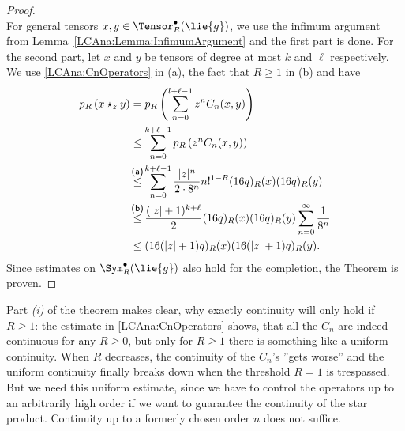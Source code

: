 \begin{proof}
\begin{equation*}
    \end{equation*}
    For general tensors $x,y \in \Tensor_R^{\bullet}(\lie{g})$, we use the 
    infimum argument from Lemma~\ref{LCAna:Lemma:InfimumArgument} and the 
    first part is done. For the second part, let $x$ and $y$
    be tensors of degree at most $k$ and $\ell$ respectively. We use
    \eqref{LCAna:CnOperators} in (a), the fact that $R \geq 1$ in (b) and have
    \begin{align}
	    \nonumber
	    	p_R \left(
	    	x \star_z y
	    	\right)
	    	& =
	    	p_R \left(
	    		\sum\limits_{n=0}^{l + \ell - 1}
	    		z^n C_n(x, y)
	    	\right)
	    	\\
	    \nonumber
	    	& \leq
	    	\sum\limits_{n=0}^{k + \ell - 1}
	    	p_R \left(
	    		z^n C_n(x, y)
	    	\right)
	    	\\
	    \label{LCAna:2MonomialEstimate}
	    	& \ot{(a)}{\leq}
	    	\sum\limits_{n=0}^{k + \ell - 1}
	    	\frac{|z|^n}{2 \cdot 8^n}
	    	n!^{1 - R}
	    	(16 q)_R(x)
	    	(16 q)_R(y)
	    	\\
	    \nonumber
	    	& \ot{(b)}{\leq}
	    	\frac{(|z| + 1)^{k + \ell}}{2}
	    	(16 q)_R(x)
	    	(16 q)_R(y)
	    	\sum\limits_{n = 0}^{\infty}
	    	\frac{1}{8^n}
			\\
		\nonumber
			& \leq
	    	(16(|z| + 1) q)_R(x)
	    	(16(|z| + 1) q)_R(y).
    \end{align}
    Since estimates on $\Sym_R^{\bullet}(\lie{g})$ also hold for the
    completion, the Theorem is proven.
\end{proof}
\begin{remark}
	Part \textit{(i)} of the theorem makes clear, why exactly continuity will 
	only hold if $R \geq 1$: the estimate in \eqref{LCAna:CnOperators} shows, 
	that all the 	$C_n$ are indeed continuous for any $R \geq 0$, but only 
	for $R \geq 1$ there is something like a uniform continuity. When $R$ 
	decreases, the continuity of the $C_n$'s ''gets worse'' and the uniform 
	continuity finally breaks down when the threshold $R = 1$ is trespassed. 
	But we need this uniform estimate, since we have to control the operators 
	up to an arbitrarily high order if we want to guarantee the continuity of 
	the 	star product. Continuity up to a formerly chosen order $n$ does not 
	suffice.
\end{remark}


